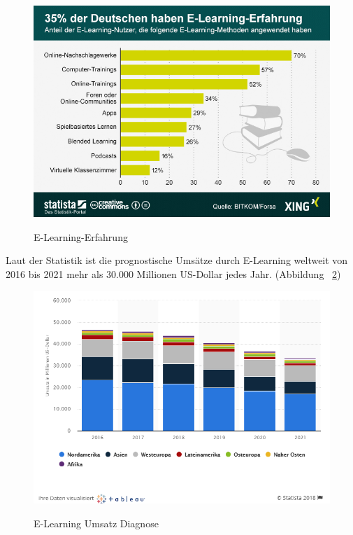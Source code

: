 \begin{figure}[ht]
\vspace*{1em}
\centering
\caption[E-Learning-Erfahrung]{E-Learning-Erfahrung}
\includegraphics[width=\textwidth]{images/eLearningErfahrung.png}
\label{fig:eLearningErfahrung} 
\end{figure}

Laut der Statistik ist die prognostische Umsätze durch E-Learning weltweit von 2016 bis 2021 mehr als 30.000 Millionen US-Dollar jedes Jahr. (Abbildung ~\ref{fig:umsatzDiagnose})

\begin{figure}[ht]
\vspace*{1em}
\centering
\caption[E-Learning Umsatz Diagnose]{E-Learning Umsatz Diagnose}
\includegraphics[width=\textwidth]{images/umsatzDiagnose.png}
\label{fig:umsatzDiagnose} 
\end{figure}

